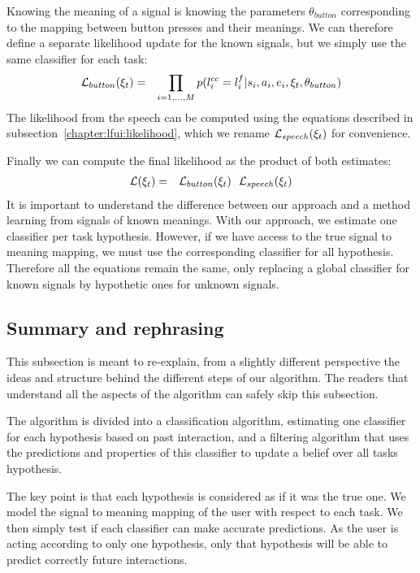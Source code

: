 Knowing the meaning of a signal is knowing the parameters $\theta_{button}$ corresponding to the mapping between button presses and their meanings. We can therefore define a separate likelihood update for the known signals, but we simply use the same classifier for each task:
%
\begin{eqnarray}
\mathcal{L}_{button}(\xi_t) &=& \prod_{i = 1,\ldots, M} p(l^{cc}_i = l^f_i | s_i, a_i, e_i, \xi_t, \theta_{button})
\end{eqnarray}
%
The likelihood from the speech can be computed using the equations described in subsection~\ref{chapter:lfui:likelihood}, which we rename $\mathcal{L}_{speech}(\xi_t)$ for convenience.

Finally we can compute the final likelihood as the product of both estimates:
%
\begin{eqnarray}
\mathcal{L}(\xi_t) &=& \mathcal{L}_{button}(\xi_t) ~~ \mathcal{L}_{speech}(\xi_t)
\end{eqnarray}
%
It is important to understand the difference between our approach and a method learning from signals of known meanings. With our approach, we estimate one classifier per task hypothesis. However, if we have access to the true signal to meaning mapping, we must use the corresponding classifier for all hypothesis. Therefore all the equations remain the same, only replacing a global classifier for known signals by hypothetic ones for unknown signals.

\subsection{Summary and rephrasing}
\label{chapter:lfui:rephrasing}

This subsection is meant to re-explain, from a slightly different perspective the ideas and structure behind the different steps of our algorithm. The readers that understand all the aspects of the algorithm can safely skip this subsection.

The algorithm is divided into a classification algorithm, estimating one classifier for each hypothesis based on past interaction, and a filtering algorithm that uses the predictions and properties of this classifier to update a belief over all tasks hypothesis.

The key point is that each hypothesis is considered as if it was the true one. We model the signal to meaning mapping of the user with respect to each task. We then simply test if each classifier can make accurate predictions. As the user is acting according to only one hypothesis, only that hypothesis will be able to predict correctly future interactions.

